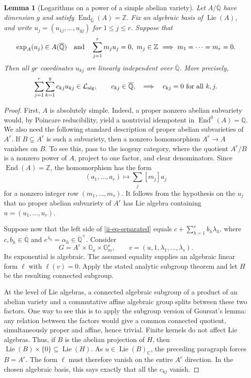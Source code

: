 \documentclass[11pt,a4paper]{article}
\newtheorem{lemma}[theorem]{Lemma}
\theoremstyle{definition}
\theoremstyle{remark}
\numberwithin{equation}{section}
\newcommand{\Qbar}{\overline{\mathbb Q}}
\begin{document}
\begin{lemma}[Logarithms on a power of a simple abelian variety]
\label{ii-lem-logarithms}
Let $A/\Qbar$ have dimension $g$ and satisfy
$\operatorname{End}_{\Qbar}(A)=\mathbb Z$.  Fix an algebraic basis of
$\operatorname{Lie}(A)$, and write $u_j=(u_{1j},\ldots,u_{gj})$ for
$1\le j\le r$.  Suppose that
\[
 \exp_A(u_j)\in A(\Qbar)
 \quad\hbox{and}\quad
 \sum_{j=1}^r m_j u_j=0,\ m_j\in\mathbb Z
       \ \Longrightarrow\ m_1=\cdots=m_r=0.
\]
Then all $gr$ coordinates $u_{kj}$ are linearly independent over $\Qbar$.
More precisely,
\begin{equation}\label{ii-eq-separated}
 \sum_{j=1}^r\sum_{k=1}^g c_{kj}u_{kj}\in\mathcal L_{\rm alg},
 \qquad c_{kj}\in\Qbar,
 \quad\Longrightarrow\quad c_{kj}=0\ \hbox{for all }k,j.
\end{equation}
\end{lemma}

\begin{proof}
First, $A$ is absolutely simple.  Indeed, a proper nonzero abelian
subvariety would, by Poincare reducibility, yield a nontrivial idempotent in
$\operatorname{End}^0(A)=\mathbb Q$.  We also need the following standard
description of proper abelian subvarieties of $A^r$.  If $B\subsetneq A^r$
is such a subvariety, then a nonzero homomorphism $A^r\to A$ vanishes on
$B$.  To see this, pass to the isogeny category, where the quotient
$A^r/B$ is a nonzero power of $A$, project to one factor, and clear
denominators.  Since $\operatorname{End}(A)=\mathbb Z$, the homomorphism
has the form
\[
 (a_1,\ldots,a_r)\longmapsto\sum_j[m_j]a_j
\]
for a nonzero integer row $(m_1,\ldots,m_r)$.
It follows from the hypothesis on the $u_j$ that no proper abelian
subvariety of $A^r$ has Lie algebra containing $u=(u_1,\ldots,u_r)$.

Suppose now that the left side of \eqref{ii-eq-separated} equals
$c+\sum_{h=1}^s b_h\lambda_h$, where $c,b_h\in\Qbar$ and
$e^{\lambda_h}=\alpha_h\in\Qbar^{\times}$.  Consider
\[
 G=A^r\times\mathbb G_a\times\mathbb G_m^s,
 \qquad v=(u,1,\lambda_1,\ldots,\lambda_s).
\]
Its exponential is algebraic.  The assumed equality supplies an
algebraic linear form $\ell$ with $\ell(v)=0$.  Apply the stated analytic
subgroup theorem and let $H$ be the resulting connected subgroup.

At the level of Lie algebras, a connected algebraic subgroup of a product
of an abelian variety and a commutative affine algebraic group splits
between these two factors.  One way to see this is to apply the subgroup
version of Goursat's lemma: any relation between the factors would give a
common connected quotient, simultaneously proper and affine, hence
trivial.  Finite kernels do not affect Lie algebras.  Thus, if $B$ is the
abelian projection of $H$, then
$\operatorname{Lie}(B)\times\{0\}\subseteq\operatorname{Lie}(H)$.
As $u\in\operatorname{Lie}(B)_{\mathbb C}$, the preceding paragraph
forces $B=A^r$.  The form $\ell$ must therefore vanish on the entire
$A^r$ direction.  In the chosen algebraic basis, this says exactly that
all the $c_{kj}$ vanish.
\end{proof}
\end{document}
